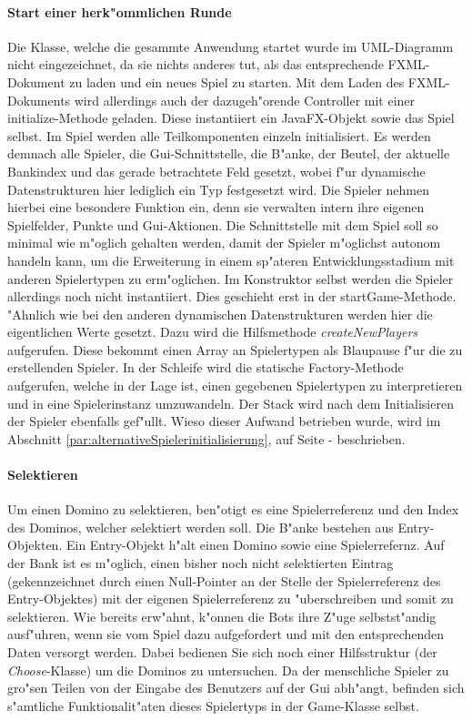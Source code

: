 \paragraph{Start einer herk"ommlichen Runde}
Die Klasse, welche die gesammte Anwendung startet wurde im UML-Diagramm nicht eingezeichnet, da sie nichts anderes tut, als das entsprechende FXML-Dokument zu laden und ein neues Spiel zu starten. Mit dem Laden des FXML-Dokuments wird allerdings auch der dazugeh"orende Controller mit einer initialize-Methode geladen. Diese instantiiert ein JavaFX-Objekt sowie das Spiel selbst. Im Spiel werden alle Teilkomponenten einzeln initialisiert. Es werden demnach alle Spieler, die Gui-Schnittstelle, die B"anke, der Beutel, der aktuelle Bankindex und das gerade betrachtete Feld gesetzt, wobei f"ur dynamische Datenstrukturen hier lediglich ein Typ festgesetzt wird. Die Spieler nehmen hierbei eine besondere Funktion ein, denn sie verwalten intern ihre eigenen Spielfelder, Punkte und Gui-Aktionen. Die Schnittstelle mit dem Spiel soll so minimal wie m"oglich gehalten werden, damit der Spieler m"oglichst autonom handeln kann, um die Erweiterung in einem sp"ateren Entwicklungsstadium mit anderen Spielertypen zu erm"oglichen. Im Konstruktor selbst werden die Spieler allerdings noch nicht instantiiert. Dies geschieht erst in der startGame-Methode. "Ahnlich wie bei den anderen dynamischen Datenstrukturen werden hier die eigentlichen Werte gesetzt. Dazu wird die Hilfsmethode \emph{createNewPlayers} aufgerufen. Diese bekommt einen Array an Spielertypen als \glqq Blaupause\grqq {} f"ur die zu erstellenden Spieler. In der Schleife wird die statische Factory-Methode aufgerufen, welche in der Lage ist, einen gegebenen Spielertypen zu interpretieren und in eine Spielerinstanz umzuwandeln. Der Stack wird nach dem Initialisieren der Spieler ebenfalls gef"ullt. Wieso dieser Aufwand betrieben wurde, wird im Abschnitt \ref{par:alternativeSpielerinitialisierung}, auf Seite \pageref{par:alternativeSpielerinitialisierung} -  beschrieben. 

\paragraph{Selektieren}
Um einen Domino zu selektieren, ben"otigt es eine Spielerreferenz und den Index des Dominos, welcher selektiert werden soll. Die B"anke bestehen aus Entry-Objekten. Ein Entry-Objekt h"alt einen Domino sowie eine Spielerrefernz. 
Auf der Bank ist es m"oglich, einen bisher noch nicht selektierten Eintrag (gekennzeichnet durch einen Null-Pointer an der Stelle der Spielerreferenz des Entry-Objektes) mit der eigenen Spielerreferenz zu "uberschreiben und somit zu selektieren. Wie bereits erw"ahnt, k"onnen die Bots ihre Z"uge selbstst"andig ausf"uhren, wenn sie vom Spiel dazu aufgefordert und mit den entsprechenden Daten versorgt werden. Dabei bedienen Sie sich noch einer Hilfsstruktur (der \emph{Choose}-Klasse) um die Dominos zu untersuchen. Da der menschliche Spieler zu gro"sen Teilen von der Eingabe des Benutzers auf der Gui abh"angt, befinden sich s"amtliche Funktionalit"aten dieses Spielertyps in der Game-Klasse selbst. 


